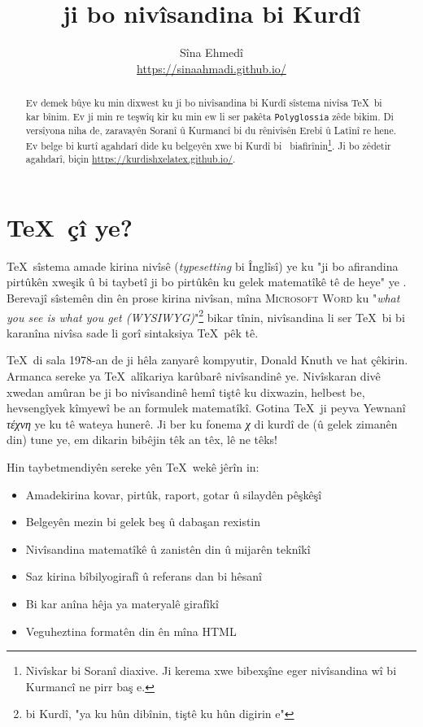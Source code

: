 \documentclass[14pt]{article}
\title{\textenglish{\XeLaTeX} ji bo nivîsandina bi Kurdî}
\author{Sîna Ehmedî \\ {\small \url{https://sinaahmadi.github.io/}}}
\date{\ontoday}
\begin{document}
\maketitle
\tableofcontents

\begin{abstract}
Ev demek bûye ku min dixwest ku ji bo nivîsandina bi Kurdî sîstema nivîsa \TeX~bi kar bînim. Ev ji min re teşwîq kir ku min ew li ser pakêta \texttt{Polyglossia} zêde bikim. Di versîyona niha de, zaravayên Soranî û Kurmancî bi du rênivîsên Erebî û Latînî re hene. Ev belge bi kurtî agahdarî dide ku belgeyên xwe bi Kurdî bi \XeLaTeX~biafirînin\footnote{Nivîskar bi Soranî diaxive. Ji kerema xwe bibexşîne eger nivîsandina wî bi Kurmancî ne pirr baş e.}. Ji bo zêdetir agahdarî, biçin \url{https://kurdishxelatex.github.io/}.
\end{abstract}


\section{\TeX~çî ye?}

\TeX~sîstema amade kirina nivîsê (\textit{typesetting} bi Înglîsî) ye ku "ji bo afirandina pirtûkên xweşik û bi taybetî ji bo pirtûkên ku gelek matematîkê tê de heye" ye \cite{knuth1984texbook}. Berevajî sîstemên din ên prose kirina nivîsan, mîna \textsc{Microsoft Word} ku "\textit{what you see is what you get (WYSIWYG)}"\footnote{bi Kurdî, "ya ku hûn dibînin, tiştê ku hûn digirin e"} bikar tînin, nivîsandina li ser \TeX~bi bi karanîna nivîsa sade li gorî sintaksiya \TeX~pêk tê.


\TeX~di sala 1978-an de ji hêla zanyarê kompyutir, Donald Knuth ve hat çêkirin. Armanca sereke ya \TeX~alîkariya karûbarê nivîsandinê ye. Nivîskaran divê xwedan amûran be ji bo nivîsandinê hemî tiştê ku dixwazin, helbest be, hevsengîyek kîmyewî be an formulek matematîkî. Gotina \TeX~ji peyva Yewnanî \textgreek{\textit{τέχνη}} ye ku tê wateya hunerê. Ji ber ku fonema \textgreek{\textit{χ}} di kurdî de (û gelek zimanên din) tune ye, em dikarin bibêjin têk an têx, lê ne têks!

\newpage

Hin taybetmendiyên sereke yên \TeX~wekê jêrîn in:

\begin{itemize}
\item Amadekirina kovar, pirtûk, raport, gotar û silaydên pêşkêşî
\item Belgeyên mezin bi gelek beş û dabaşan rexistin
\item Nivîsandina matematîkê û zanistên din û mijarên teknîkî
\item Saz kirina bîbilyogirafî û referans dan bi hêsanî
\item Bi kar anîna hêja ya materyalê girafîkî
\item Veguheztina formatên din ên mîna HTML
\end{itemize}
\end{document}
